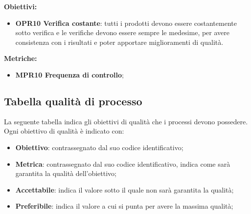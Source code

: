 \documentclass[../piano_di_qualifica.tex]{subfiles}
\begin{document}
\textbf{Obiettivi:}
\smallbreak
\begin{itemize}
	\item \textbf{OPR10 Verifica costante}: tutti i prodotti devono essere costantemente sotto verifica e le verifiche devono essere sempre le medesime, per avere consistenza con i risultati e poter apportare miglioramenti di qualità.
\end{itemize}

\textbf{Metriche:}
\smallbreak
\begin{itemize}
	\item \textbf{MPR10 Frequenza di controllo};
\end{itemize}

\subsection{Tabella qualità di processo}
La seguente tabella indica gli obiettivi di qualità che i processi devono possedere.\\
Ogni obiettivo di qualità è indicato con:
\smallbreak
\begin{itemize}
	\item \textbf{Obiettivo}: contrassegnato dal suo codice identificativo;
	\item \textbf{Metrica}: contrassegnato dal suo codice identificativo, indica come sarà garantita la qualità dell'obiettivo;
	\item \textbf{Accettabile}: indica il valore sotto il quale non sarà garantita la qualità;
	\item \textbf{Preferibile}: indica il valore a cui si punta per avere la massima qualità;
\end{itemize}
\end{document}
